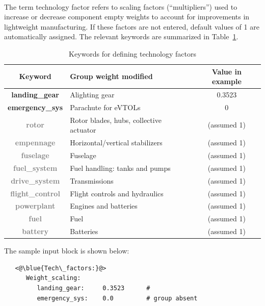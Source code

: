 \paragraph{}
The term technology factor refers to scaling factors (``multipliers'') used to increase or decrease component empty weights to account for improvements in lightweight manufacturing. If these factors are not entered, default values of 1  are automatically assigned. The relevant keywords are summarized in Table~\ref{tbl:techfac_keywords}.
\begin{center}
  \begin{table}[H]
	\caption{Keywords for defining technology factors}
	\label{tbl:techfac_keywords}
    \begin{tabular}{| c | l | c |}
    \hline
    Keyword & Group weight modified & Value in example \\ 
    \hline
\textbf{landing\_gear} & Alighting gear &  0.3523 \\
\textbf{emergency\_sys} & Parachute for eVTOLs & 0 \\
\textcolor{gray}{\textbf{rotor}} & Rotor blades, hubs, collective actuator & (assumed 1) \\
\textcolor{gray}{\textbf{empennage}} & Horizontal/vertical stabilizers & (assumed 1) \\
\textcolor{gray}{\textbf{fuselage}} & Fuselage & (assumed 1) \\
\textcolor{gray}{\textbf{fuel\_system}} & Fuel handling: tanks and pumps & (assumed 1) \\
\textcolor{gray}{\textbf{drive\_system}} & Transmissions & (assumed 1) \\
\textcolor{gray}{\textbf{flight\_control}} & Flight controls and hydraulics& (assumed 1) \\
\textcolor{gray}{\textbf{powerplant}} & Engines and batteries & (assumed 1) \\
\textcolor{gray}{\textbf{fuel}} & Fuel & (assumed 1) \\
\textcolor{gray}{\textbf{battery}} & Batteries & (assumed 1) \\
     \hline
  \end{tabular}
\end{table}
\end{center}
\vspace{-1cm}
The sample input block is shown below:
\begin{lstlisting}
   <@\blue{Tech\_factors:}@>
      Weight_scaling:
         landing_gear:     0.3523      #  
         emergency_sys:    0.0         # group absent
\end{lstlisting}

